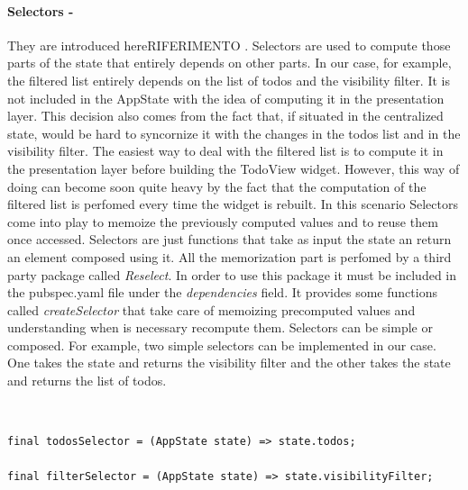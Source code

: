 \paragraph{Selectors - }
\label{subpar:todo_app_bloc_core_state}
They are introduced hereRIFERIMENTO . Selectors are used to compute those parts of the state that entirely depends on other parts. In our case, for example, the filtered list entirely depends on the list of todos and the visibility filter. It is not included in the AppState with the idea of computing it in the presentation layer. This decision also comes from the fact that, if situated in the centralized state, would be hard to syncornize it with the changes in the todos list and in the visibility filter. The easiest way to deal with the filtered list is to compute it in the presentation layer before building the TodoView widget. However, this way of doing can become soon quite heavy by the fact that the computation of the filtered list is perfomed every time the widget is rebuilt. In this scenario Selectors come into play to memoize the previously computed values and to reuse them once accessed. Selectors are just functions that take as input the state an return an element composed using it. All the memorization part is perfomed by a third party package called \textit{Reselect}. In order to use this package it must be included in the pubspec.yaml file under the \textit{dependencies} field. It provides some functions called \textit{createSelector} that take care of memoizing precomputed values and understanding when is necessary recompute them. Selectors can be simple or composed. For example, two simple selectors can be implemented in our case. One takes the state and returns the visibility filter and the other takes the state and returns the list of todos.
\begin{code}
\mbox{}\\
 \mbox{}
		\label{code:2.14}
\begin{verbatim}
final todosSelector = (AppState state) => state.todos;

final filterSelector = (AppState state) => state.visibilityFilter;
\end{verbatim}
\mbox{}
\end{code}

